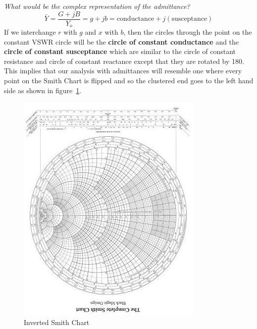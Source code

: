 \emph{What would be the complex representation of the admittance?}
\begin{dmath*}
\bar{Y}=\frac{G + jB}{Y_o} = g + jb
= \text{conductance} + j (\text{susceptance})
\end{dmath*}
If we interchange $r$ with $g$ and $x$ with $b$, then the circles through the point on the constant VSWR circle will be the \textbf{circle of constant conductance} and the \textbf{circle of constant susceptance} which are similar to the circle of constant resistance and circle of constant reactance except that they are rotated by 180\textdegree\;. This implies that our analysis with admittances will resemble one where every point on the Smith Chart is flipped and so the clustered end goes to the left hand side as shown in figure~\ref{fig:invertedsmithchart}.
\begin{figure}[h]
\centering
\includegraphics*[width=0.7\linewidth]{./graphics/smithchart1.jpeg}
\caption{Inverted Smith Chart}\label{fig:invertedsmithchart}
\end{figure}

